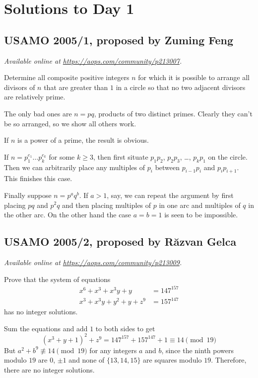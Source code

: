 \documentclass[11pt]{scrartcl}
\begin{document}
\section{Solutions to Day 1}
\subsection{USAMO 2005/1, proposed by Zuming Feng}
\textsl{Available online at \url{https://aops.com/community/p213007}.}
\begin{mdframed}[style=mdpurplebox,frametitle={Problem statement}]
Determine all composite positive integers $n$ for which
it is possible to arrange all divisors of $n$ that are greater than $1$
in a circle so that no two adjacent divisors are relatively prime.
\end{mdframed}
The only bad ones are $n = pq$,
products of two distinct primes.
Clearly they can't be so arranged,
so we show all others work.
\begin{itemize}
\ii If $n$ is a power of a prime, the result is obvious.

\ii If $n = p_1^{e_1} \dots p_k^{e_k}$ for some $k \ge 3$,
then first situate $p_1p_2$, $p_2p_3$, \dots, $p_kp_1$
on the circle.
Then we can arbitrarily place any multiples of $p_i$
between $p_{i-1} p_i$ and $p_i p_{i+1}$.
This finishes this case.

\ii Finally suppose $n = p^a q^b$.
If $a > 1$, say, we can repeat the argument by first placing
$pq$ and $p^2q$ and then placing multiples of $p$ in one arc
and multiples of $q$ in the other arc.
On the other hand the case $a=b=1$ is seen to be impossible.
\end{itemize}
\pagebreak

\subsection{USAMO 2005/2, proposed by R\u{a}zvan Gelca}
\textsl{Available online at \url{https://aops.com/community/p213009}.}
\begin{mdframed}[style=mdpurplebox,frametitle={Problem statement}]
Prove that the system of equations
\begin{align*}
  x^6 + x^3 + x^3y + y &= 147^{157} \\
  x^3 + x^3y + y^2 + y + z^9 &= 157^{147}
\end{align*}
has no integer solutions.
\end{mdframed}
Sum the equations and add $1$ to both sides to get
\[ (x^3+y+1)^2 + z^9 = 147^{157} + 157^{147} + 1
  \equiv 14 \pmod{19} \]
But $a^2 + b^9 \not\equiv 14 \pmod{19}$
for any integers $a$ and $b$,
since the ninth powers modulo $19$ are $0$, $\pm 1$
and none of $\{13, 14, 15\}$ are squares modulo $19$.
Therefore, there are no integer solutions.
\end{document}
